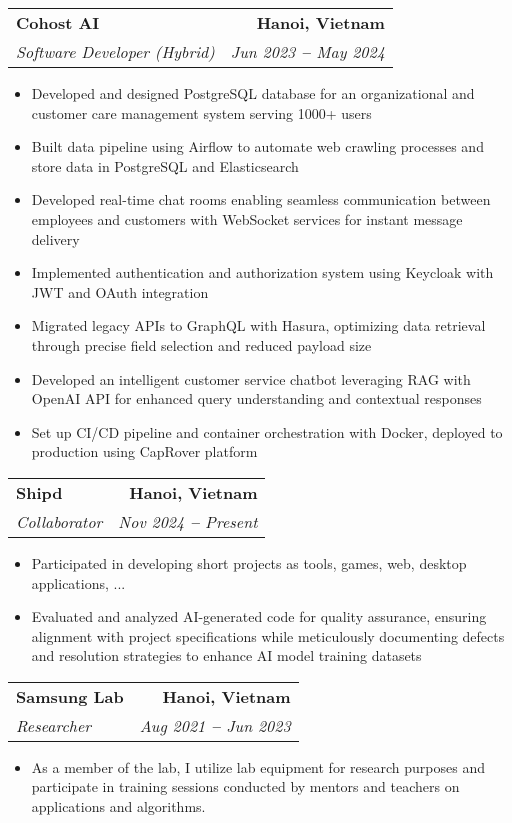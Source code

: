 \documentclass[letterpaper,11pt]{article}
\makeatletter
\newcommand{\resumeItem}[1]{
  \item\small{
  {#1 \vspace{-2pt}}
  }
}
\newcommand{\resumeSubheading}[4]{
  \vspace{-2pt}\item
    \begin{tabular*}{0.97\textwidth}[t]{l@{\extracolsep{\fill}}r}
      \textbf{#1} & #2 \\
      \textit{\small#3} & \textit{\small #4} \\
    \end{tabular*}\vspace{-7pt}
}
\newcommand{\resumeItemListStart}{\begin{itemize}}
\newcommand{\resumeItemListEnd}{\end{itemize}\vspace{-5pt}}
\makeatother
\begin{document}
\resumeSubheading
{\textbf{\faBuildingO \hspace{4pt} Cohost AI}}{\textbf{Hanoi, Vietnam}}
{Software Developer (Hybrid)}{Jun 2023 \textbf{--} May 2024}
\resumeItemListStart
\vspace{4pt}
\resumeItem{Developed and designed PostgreSQL database for an organizational and customer care management system serving 1000+ users}
\vspace{4pt}
\resumeItem{Built data pipeline using Airflow to automate web crawling processes and store data in PostgreSQL and Elasticsearch}
\vspace{4pt}
\resumeItem{Developed real-time chat rooms enabling seamless communication between employees and customers with WebSocket services for instant message delivery}
\vspace{4pt}
\resumeItem{Implemented authentication and authorization system using Keycloak with JWT and OAuth integration}
\vspace{4pt}
\resumeItem{Migrated legacy APIs to GraphQL with Hasura, optimizing data retrieval through precise field selection and reduced payload size}
\vspace{4pt}
\resumeItem{Developed an intelligent customer service chatbot leveraging RAG with OpenAI API for enhanced query understanding and contextual responses}
\vspace{4pt}
\resumeItem{Set up CI/CD pipeline and container orchestration with Docker, deployed to production using CapRover platform}
\vspace{4pt}

\resumeItemListEnd
\vspace{20pt}

\resumeSubheading
{\textbf{\faGlobe \hspace{4pt} Shipd}}{\textbf{Hanoi, Vietnam}}
{Collaborator}{Nov 2024 \textbf{--} Present}
\resumeItemListStart
\vspace{4pt}
\resumeItem{Participated in developing short projects as tools, games, web, desktop applications, ...}
\vspace{4pt}
\resumeItem{Evaluated and analyzed AI-generated code for quality assurance, ensuring alignment with project specifications while meticulously documenting defects and resolution strategies to enhance AI model training datasets}
\vspace{4pt}
\resumeItemListEnd

\resumeSubheading
{\textbf{\faGlobe \hspace{4pt} Samsung Lab}}{\textbf{Hanoi, Vietnam}}
{Researcher}{Aug 2021 \textbf{--} Jun 2023}
\resumeItemListStart
\vspace{4pt}
\resumeItem{As a member of the lab, I utilize lab equipment for research purposes and participate in training sessions conducted by mentors and teachers on applications and algorithms.}
\vspace{4pt}
\resumeItemListEnd
\end{document}
